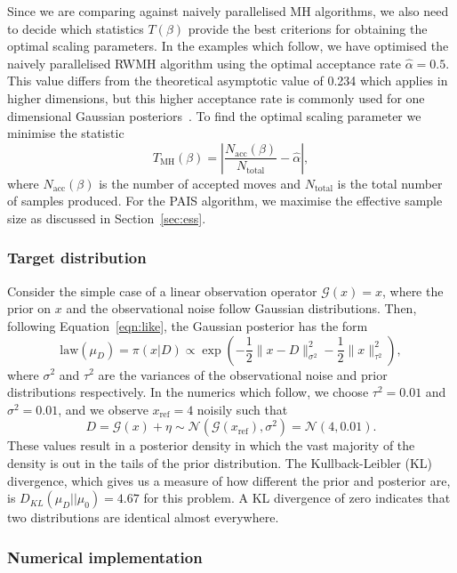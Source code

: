 \documentclass[final]{siamltex}
\newcommand{\G}{\mathcal{G}}
\begin{document}
Since we are comparing against naively parallelised MH algorithms,
we also need to decide which statistics $T(\beta)$ provide the best criterions
for obtaining the optimal scaling parameters. In the examples which follow, we have
optimised the naively parallelised RWMH algorithm using the optimal
acceptance rate $\hat{\alpha} = 0.5$. This value differs from the theoretical
asymptotic value of 0.234 which applies in higher dimensions, but this higher acceptance rate is commonly used for one dimensional Gaussian posteriors~\cite{rosenthal2011optimal}. To find the optimal
scaling parameter we minimise the statistic
\[
	T_{\text{MH}}(\beta) = \left| \frac{N_{\text{acc}}(\beta)}{N_{\text{total}}} - \hat{\alpha} \right|,
\]
where $N_{\text{acc}}(\beta)$ is the number of accepted moves and
$N_{\text{total}}$ is the total number of samples produced. For the
PAIS algorithm, we maximise the effective sample size as
discussed in Section~\ref{sec:ess}.

\subsubsection{Target distribution}

Consider the simple case of a linear observation operator $\G(x) = x$, where the prior on $x$ and the observational noise follow Gaussian distributions. Then, following Equation~\ref{eqn:like}, the Gaussian posterior has the form
\begin{equation}\label{eqn:Gaussian posterior}
	\text{law}(\mu_D) = \pi(x|D) \propto \exp\left(-\frac{1}{2}\big\|x - D\big\|^2_{\sigma^2} - \frac{1}{2}\big\|x\big\|^2_{\tau^2}\right),
\end{equation}
where $\sigma^2$ and $\tau^2$ are the variances of the
observational noise and prior distributions respectively. In the
numerics which follow, we choose $\tau^2 =0.01$ and $\sigma^2 = 0.01$, and
we observe $x_\text{ref}=4$ noisily such that
\[
D = \mathcal{G}(x) + \eta \sim \mathcal{N}(\mathcal{G}(x_\text{ref}),\sigma^2) = \mathcal{N}(4,0.01).
\]
These values result in a posterior density in which the vast majority
of the density is out in the tails of the
prior distribution. The Kullback-Leibler (KL)
divergence, which gives us a measure of how different the prior and
posterior are, is $D_{KL}(\mu_D || \mu_0) = 4.67$ for this
problem. A KL divergence of zero indicates that two distributions are
identical almost everywhere.

\subsubsection{Numerical implementation}\label{sec:Implementation P1}
\end{document}
